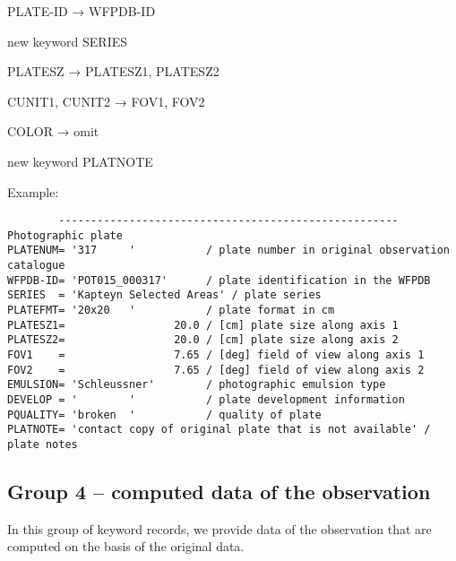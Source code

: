 \documentclass[11pt]{ivoa}
\begin{document}
PLATE-ID → WFPDB-ID

new keyword SERIES

PLATESZ → PLATESZ1, PLATESZ2

CUNIT1, CUNIT2 → FOV1, FOV2

COLOR → omit

new keyword PLATNOTE


Example:

\begin{lstlisting}
        ----------------------------------------------------- Photographic plate
PLATENUM= '317     '           / plate number in original observation catalogue
WFPDB-ID= 'POT015_000317'      / plate identification in the WFPDB
SERIES  = 'Kapteyn Selected Areas' / plate series
PLATEFMT= '20x20   '           / plate format in cm
PLATESZ1=                 20.0 / [cm] plate size along axis 1
PLATESZ2=                 20.0 / [cm] plate size along axis 2
FOV1    =                 7.65 / [deg] field of view along axis 1
FOV2    =                 7.65 / [deg] field of view along axis 2
EMULSION= 'Schleussner'        / photographic emulsion type
DEVELOP = '        '           / plate development information
PQUALITY= 'broken  '           / quality of plate
PLATNOTE= 'contact copy of original plate that is not available' / plate notes
\end{lstlisting}

\subsection{Group 4 – computed data of the observation}

In this group of keyword records, we provide data of the observation
that are computed on the basis of the original data.
\end{document}
